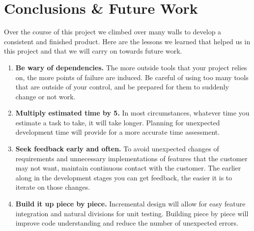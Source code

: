 \chapter{Conclusions \& Future Work}

Over the course of this project we climbed over many walls to develop a consistent and finished product. Here are the lessons we learned that helped us in this project and that we will carry on towards future work.

\begin{enumerate}
	\item \textbf{Be wary of dependencies.} The more outside tools that your project relies on, the more points of failure are induced. Be careful  of using too many tools that are outside of your control, and be prepared for them to suddenly change or not work.
	\item \textbf{Multiply estimated time by 5.} In most circumstances, whatever time you estimate a task to take, it will take longer. Planning for unexpected development time will provide for a more accurate time assessment. 
	\item \textbf{Seek feedback early and often.} To avoid unexpected changes of requirements and unnecessary implementations of features that the customer may not want, maintain continuous contact with the customer. The earlier along in the development stages you can get feedback, the easier it is to iterate on those changes.
	\item \textbf{Build it up piece by piece.} Incremental design will allow for easy feature integration and natural divisions for unit testing. Building piece by piece will improve code understanding and reduce the number of unexpected errors.
\end{enumerate}
